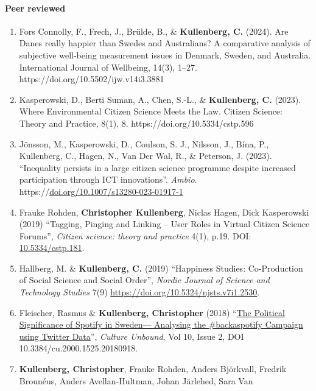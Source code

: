 \documentclass[
]{article}
\begin{document}
\hypertarget{peer-reviewed}{%
\paragraph{Peer reviewed}\label{peer-reviewed}}

\begin{enumerate}
\def\labelenumi{\arabic{enumi}.}
\item
  Fors Connolly, F., Frech, J., Brülde, B., \& \textbf{Kullenberg, C.}
  (2024). Are Danes really happier than Swedes and Australians? A
  comparative analysis of subjective well-being measurement issues in
  Denmark, Sweden, and Australia. International Journal of Wellbeing,
  14(3), 1--27. https://doi.org/10.5502/ijw.v14i3.3881
\item
  Kasperowski, D., Berti Suman, A., Chen, S.-L., \& \textbf{Kullenberg,
  C.} (2023). Where Environmental Citizen Science Meets the Law. Citizen
  Science: Theory and Practice, 8(1), 8.
  https://doi.org/10.5334/cstp.596
\item
  Jönsson, M., Kasperowski, D., Coulson, S. J., Nilsson, J., Bína, P.,
  Kullenberg, C., Hagen, N., Van Der Wal, R., \& Peterson, J. (2023).
  ``Inequality persists in a large citizen science programme despite
  increased participation through ICT innovations''. \emph{Ambio}.
  https://\href{https://doi.org/10.1007/s13280-023-01917-1}{doi.org/10.1007/s13280-023-01917-1}
\item
  Frauke Rohden, \textbf{Christopher Kullenberg}, Niclas Hagen, Dick
  Kasperowski (2019) ``Tagging, Pinging and Linking -- User Roles in
  Virtual Citizen Science Forums'', \emph{Citizen science: theory and
  practice} 4(1), p.19. DOI:
  \href{https://doi.org/10.5334/cstp.181}{10.5334/cstp.181}.
\item
  Hallberg, M. \& \textbf{Kullenberg, C.} (2019) ``Happiness Studies:
  Co-Production of Social Science and Social Order'', \emph{Nordic
  Journal of Science and Technology Studies} 7(9)
  \url{https://doi.org/10.5324/njsts.v7i1.2530}.
\item
  Fleischer, Rasmus \& \textbf{Kullenberg, Christopher} (2018)
  ``\href{http://www.cultureunbound.ep.liu.se/article.asp?DOI=10.3384/cu.2000.1525.20180918}{The
  Political Significance of Spotify in Sweden--- Analysing the
  \#backaspotify Campaign using Twitter Data}'', \emph{Culture Unbound},
  Vol 10, Issue 2, DOI 10.3384/cu.2000.1525.20180918.
\item
  \textbf{Kullenberg, Christopher}, Frauke Rohden, Anders Björkvall,
  Fredrik Brounéus, Anders Avellan-Hultman, Johan Järlehed, Sara Van

\end{enumerate}
\end{document}
